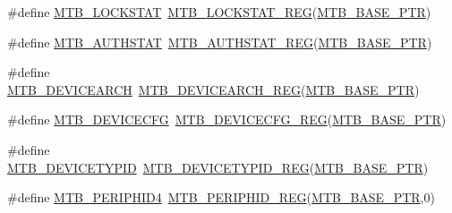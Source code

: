 \begin{DoxyCompactItemize}
\item 
\#define \hyperlink{group___m_t_b___register___accessor___macros_gaebecb4529453581f85d19cacab9c0508}{M\+T\+B\+\_\+\+L\+O\+C\+K\+S\+T\+AT}~\hyperlink{group___m_t_b___register___accessor___macros_ga7a6b7214439d9309e60ef1c130eb5624}{M\+T\+B\+\_\+\+L\+O\+C\+K\+S\+T\+A\+T\+\_\+\+R\+EG}(\hyperlink{group___m_t_b___peripheral_gadf7f362dfa67354951e6a23ddf08cd73}{M\+T\+B\+\_\+\+B\+A\+S\+E\+\_\+\+P\+TR})
\item 
\#define \hyperlink{group___m_t_b___register___accessor___macros_gaf3db7626003fd4b420efaf3c34278d76}{M\+T\+B\+\_\+\+A\+U\+T\+H\+S\+T\+AT}~\hyperlink{group___m_t_b___register___accessor___macros_ga589d384dfb47772beaa66d10ea28a5e4}{M\+T\+B\+\_\+\+A\+U\+T\+H\+S\+T\+A\+T\+\_\+\+R\+EG}(\hyperlink{group___m_t_b___peripheral_gadf7f362dfa67354951e6a23ddf08cd73}{M\+T\+B\+\_\+\+B\+A\+S\+E\+\_\+\+P\+TR})
\item 
\#define \hyperlink{group___m_t_b___register___accessor___macros_ga1335969fc1d5c066fb8d087c6851fb5e}{M\+T\+B\+\_\+\+D\+E\+V\+I\+C\+E\+A\+R\+CH}~\hyperlink{group___m_t_b___register___accessor___macros_gacbb6c352d25d7cb7f695ac7741ae78f0}{M\+T\+B\+\_\+\+D\+E\+V\+I\+C\+E\+A\+R\+C\+H\+\_\+\+R\+EG}(\hyperlink{group___m_t_b___peripheral_gadf7f362dfa67354951e6a23ddf08cd73}{M\+T\+B\+\_\+\+B\+A\+S\+E\+\_\+\+P\+TR})
\item 
\#define \hyperlink{group___m_t_b___register___accessor___macros_ga2612f1a6a7623fbe2e55b49a028e227e}{M\+T\+B\+\_\+\+D\+E\+V\+I\+C\+E\+C\+FG}~\hyperlink{group___m_t_b___register___accessor___macros_ga0aea42961121417709e9aa7625216071}{M\+T\+B\+\_\+\+D\+E\+V\+I\+C\+E\+C\+F\+G\+\_\+\+R\+EG}(\hyperlink{group___m_t_b___peripheral_gadf7f362dfa67354951e6a23ddf08cd73}{M\+T\+B\+\_\+\+B\+A\+S\+E\+\_\+\+P\+TR})
\item 
\#define \hyperlink{group___m_t_b___register___accessor___macros_gae7594a40064338c8e22f729511a20475}{M\+T\+B\+\_\+\+D\+E\+V\+I\+C\+E\+T\+Y\+P\+ID}~\hyperlink{group___m_t_b___register___accessor___macros_gacbe9bf97189a4f6f2b4816c957e4bbf3}{M\+T\+B\+\_\+\+D\+E\+V\+I\+C\+E\+T\+Y\+P\+I\+D\+\_\+\+R\+EG}(\hyperlink{group___m_t_b___peripheral_gadf7f362dfa67354951e6a23ddf08cd73}{M\+T\+B\+\_\+\+B\+A\+S\+E\+\_\+\+P\+TR})
\item 
\#define \hyperlink{group___m_t_b___register___accessor___macros_ga9332069b62de88f23a50e30da92309ef}{M\+T\+B\+\_\+\+P\+E\+R\+I\+P\+H\+I\+D4}~\hyperlink{group___m_t_b___register___accessor___macros_gafcffdf38c49f6e8fafa6d701a8cc3109}{M\+T\+B\+\_\+\+P\+E\+R\+I\+P\+H\+I\+D\+\_\+\+R\+EG}(\hyperlink{group___m_t_b___peripheral_gadf7f362dfa67354951e6a23ddf08cd73}{M\+T\+B\+\_\+\+B\+A\+S\+E\+\_\+\+P\+TR},0)

\end{DoxyCompactItemize}
